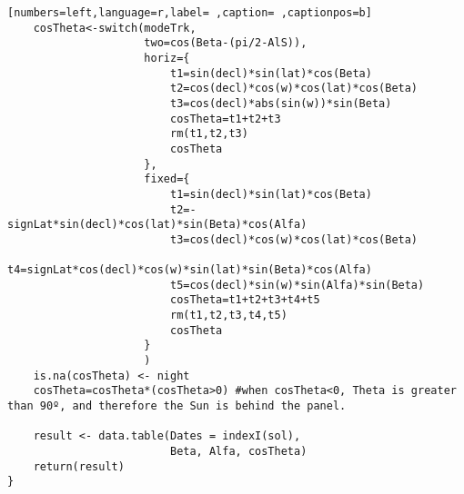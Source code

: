 \begin{lstlisting}[numbers=left,language=r,label= ,caption= ,captionpos=b]
    cosTheta<-switch(modeTrk,
                     two=cos(Beta-(pi/2-AlS)),
                     horiz={
                         t1=sin(decl)*sin(lat)*cos(Beta)      
                         t2=cos(decl)*cos(w)*cos(lat)*cos(Beta)   
                         t3=cos(decl)*abs(sin(w))*sin(Beta)   
                         cosTheta=t1+t2+t3
                         rm(t1,t2,t3)
                         cosTheta
                     },
                     fixed={
                         t1=sin(decl)*sin(lat)*cos(Beta)      
                         t2=-signLat*sin(decl)*cos(lat)*sin(Beta)*cos(Alfa) 
                         t3=cos(decl)*cos(w)*cos(lat)*cos(Beta)   
                         t4=signLat*cos(decl)*cos(w)*sin(lat)*sin(Beta)*cos(Alfa) 
                         t5=cos(decl)*sin(w)*sin(Alfa)*sin(Beta)   
                         cosTheta=t1+t2+t3+t4+t5
                         rm(t1,t2,t3,t4,t5)
                         cosTheta
                     }
                     )
    is.na(cosTheta) <- night
    cosTheta=cosTheta*(cosTheta>0) #when cosTheta<0, Theta is greater than 90º, and therefore the Sun is behind the panel.

    result <- data.table(Dates = indexI(sol),
                         Beta, Alfa, cosTheta)
    return(result)
}
\end{lstlisting}
